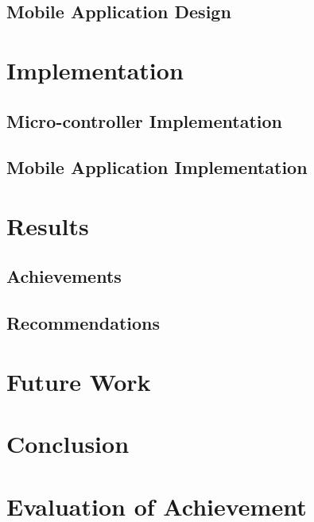 \documentclass{article}
\begin{document}
		\subsection{Mobile Application Design}
			\lipsum[1]

	\section{Implementation}
		\subsection{Micro-controller Implementation}
			\lipsum[1]
			
		\subsection{Mobile Application Implementation}
			\lipsum[1]
			
	\section{Results}
		\subsection{Achievements}
			\lipsum[1]
			
		\subsection{Recommendations}
			\lipsum[1]
			
	\section{Future Work}
		\lipsum[1]
	
	\section{Conclusion}
		\lipsum[1]
		
	\section{Evaluation of Achievement}
		\lipsum[1]
		
	
	
	

	\newpage
\end{document}
